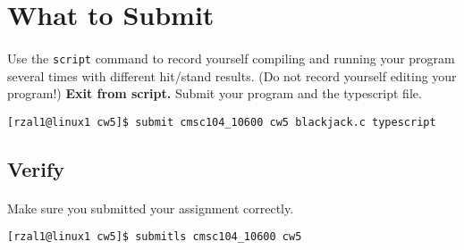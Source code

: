 \documentclass[letter,11pt]{article}
\begin{document}
\section*{What to Submit}
\paragraph{}Use the \texttt{script} command to record yourself compiling and running your program several times with different hit/stand results. (Do not record yourself editing your program!) \textbf{Exit from script.} Submit your program and the typescript file.
\begin{verbatim}
[rzal1@linux1 cw5]$ submit cmsc104_10600 cw5 blackjack.c typescript
\end{verbatim}

\subsection*{Verify}
\paragraph{}Make sure you submitted your assignment correctly.
\begin{verbatim}
[rzal1@linux1 cw5]$ submitls cmsc104_10600 cw5
\end{verbatim}
\end{document}
